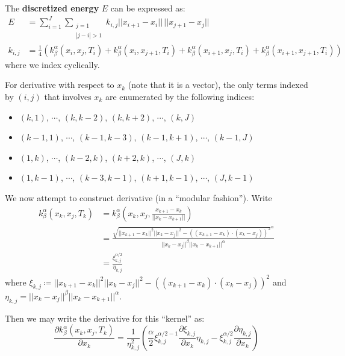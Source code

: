 \documentclass[a4paper]{article}
\newcommand{\norm}[1]{||#1||}
\begin{document}
The \textbf{discretized energy} $E$ can be expressed as:
\begin{align}
    E &= \sum_{i = 1}^{J} \sum_{\substack{j = 1 \\ |j-i| > 1}} k_{i,j} \norm{x_{i+1} - x_i} \, \norm{x_{j+1} - x_j} 
    \label{equ: Discretized Energy}
    \\
    k_{i,j} &= \frac{1}{4} \left( 
        k_{\beta}^{\alpha} \left( x_i, x_j, T_i \right)
        + k_{\beta}^{\alpha} \left( x_i, x_{j+1}, T_i \right)
        + k_{\beta}^{\alpha} \left( x_{i+1}, x_j, T_i \right)
        + k_{\beta}^{\alpha} \left( x_{i+1}, x_{j+1}, T_i \right)
    \right)
\end{align}
where we index cyclically.

For derivative with respect to $x_k$ (note that it is a vector), the only terms indexed by
$(i,j)$ that involves $x_k$ are enumerated by the following indices:
\begin{itemize}
    \item $(k,1)$, $\cdots$, $(k, k-2)$, $(k, k+2)$, $\cdots$, $(k,J)$
    \item $(k-1,1)$, $\cdots$, $(k-1, k-3)$, $(k-1, k+1)$, $\cdots$, $(k-1,J)$
    \item $(1,k)$, $\cdots$, $(k-2, k)$, $(k+2, k)$, $\cdots$, $(J,k)$
    \item $(1,k-1)$, $\cdots$, $(k-3, k-1)$, $(k+1, k-1)$, $\cdots$, $(J,k-1)$
\end{itemize}

We now attempt to construct derivative (in a ``modular fashion'').
Write 
\begin{align}
    k_{\beta}^{\alpha} \left( x_k, x_j, T_k \right) &= k_{\beta}^{\alpha} \left( x_k, x_j, \frac{x_{k+1} - x_{k}}{\norm{x_{k} - x_{k+1}}} \right)
    \\
    &= \frac{\sqrt{\norm{x_{k+1} - x_k}^2 \norm{x_k - x_j}^2- \left( \left( x_{k+1} - x_{k} \right) \cdot \left( x_{k} - x_{j} \right) \right)^2}^{\alpha} }{\norm{x_k - x_j}^{\beta} \norm{x_k - x_{k+1}}^{\alpha}} \\
    &= \frac{\xi_{k,j}^{\alpha/2}}{\eta_{k,j}}
\end{align}
where $\xi_{k,j} \coloneqq \norm{x_{k+1} - x_k}^2 \norm{x_k - x_j}^2- \left( \left( x_{k+1} - x_{k} \right) \cdot \left( x_{k} - x_{j} \right) \right)^2$ and $\eta_{k,j} = \norm{x_k -x_j}^{\beta} \norm{x_k - x_{k+1}}^{\alpha}$.

Then we may write the derivative for this ``kernel'' as:
\begin{equation}
    \frac{\partial k_{\beta}^{\alpha} \left( x_k, x_j, T_k \right)}{\partial x_k} =
\frac{1}{\eta_{k,j}^{2}} \left( \frac{\alpha}{2} \xi_{k,j}^{\alpha/2 - 1} \frac{\partial \xi_{k,j}}{\partial x_k} \eta_{k,j} - \xi_{k,j}^{\alpha/2} \frac{\partial \eta_{k,j}}{\partial x_k} \right)
\end{equation}
\end{document}
